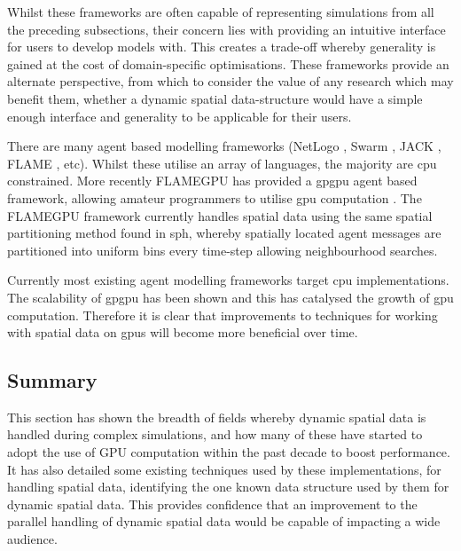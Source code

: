     Whilst these frameworks are often capable of representing simulations from all the preceding subsections, their concern lies with providing an intuitive interface for users to develop models with. This creates a trade-off whereby generality is gained at the cost of domain-specific optimisations. These frameworks provide an alternate perspective, from which to consider the value of any research which may benefit them, whether a dynamic spatial data-structure would have a simple enough interface and generality to be applicable for their users.
    
    There are many agent based modelling frameworks (NetLogo \cite{NETLOGO}, Swarm \cite{SWARM}, JACK \cite{JACK}, FLAME \cite{KR*10}, etc). Whilst these utilise an array of languages, the majority are \gls{cpu} constrained. More recently FLAMEGPU has provided a \gls{gpgpu} agent based framework, allowing amateur programmers to utilise \gls{gpu} computation \cite{KR*10}. The FLAMEGPU framework currently handles spatial data using the same spatial partitioning method found in \gls{sph}, whereby spatially located agent messages are partitioned into uniform bins every time-step allowing neighbourhood searches.

    Currently most existing agent modelling frameworks target \gls{cpu} implementations. The scalability of \gls{gpgpu} has been shown \cite{DLR07} and this has catalysed the growth of \gls{gpu} computation. Therefore it is clear that improvements to techniques for working with spatial data on \glspl{gpu} will become more beneficial over time.
    
  \subsection{Summary}
    This section has shown the breadth of fields whereby dynamic spatial data is handled during complex simulations, and how many of these have started to adopt the use of GPU computation within the past decade to boost performance. It has also detailed some existing techniques used by these implementations, for handling spatial data, identifying the one known data structure used by them for dynamic spatial data. This provides confidence that an improvement to the parallel handling of dynamic spatial data would be capable of impacting a wide audience.
